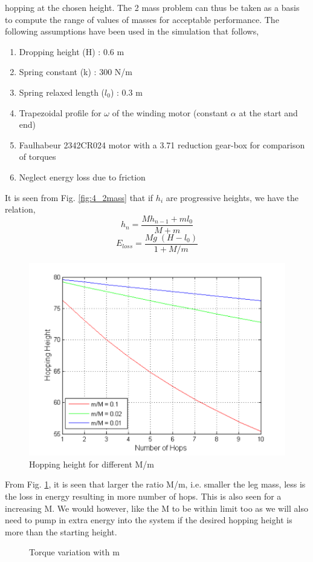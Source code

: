 hopping at the chosen height. The 2 mass problem can thus be taken as a basis to compute the range of values of masses
for acceptable performance. The following assumptions have been used in the simulation that follows,
\begin{enumerate}
\item
Dropping height (H) : 0.6 m
\item
Spring constant (k) : 300 N/m
\item
Spring relaxed length ($l_0$) : 0.3 m
\item
Trapezoidal profile for $\omega$ of the winding motor (constant $\alpha$ at the start and end)
\item
Faulhabeur 2342CR024 motor with a 3.71 reduction gear-box for comparison of torques
\item
Neglect energy loss due to friction
\end{enumerate}
It is seen from Fig. \ref{fig:4_2mass} that if $h_i$ are progressive heights, we have the relation,
\begin{equation}
h_n = \frac{Mh_{n-1} + ml_0}{M + m}
\end{equation}
\begin{equation}
\label{eqn:4_eloss}
E_{loss} = \frac{Mg\;(H-l_0)}{1 + M/m}
\end{equation}

\begin{figure}[!h]
\centering
\includegraphics[scale=0.8]{fig/2mass_hopheight.pdf}
\caption{Hopping height for different M/m}
\label{fig:4_hopping_height}
\end{figure}
From Fig. \ref{fig:4_hopping_height}, it is seen that larger the ratio M/m, i.e. smaller the leg
mass, less is the loss in energy resulting in more number of hops. This is also seen for a increasing M. We would however,
like the M to be within limit too as we will also need to pump in extra energy into the system if the desired hopping
height is more than the starting height.
\begin{figure}[!h]
\centering
\caption{Torque variation with m}
\label{fig:4_torque2mss}
\end{figure}

